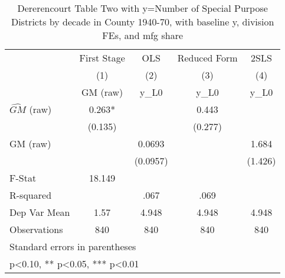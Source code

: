 \begin{table}[htbp]\centering
\def\sym#1{\ifmmode^{#1}\else\(^{#1}\)\fi}
\caption{Dererencourt Table Two with y=Number of Special Purpose Districts by decade in County 1940-70, with baseline y, division FEs, and mfg share}
\begin{tabular}{l*{4}{c}}
\toprule
                    & First Stage   &         OLS   &Reduced Form   &        2SLS   \\
                    &\multicolumn{1}{c}{(1)}&\multicolumn{1}{c}{(2)}&\multicolumn{1}{c}{(3)}&\multicolumn{1}{c}{(4)}\\
                    &\multicolumn{1}{c}{GM  (raw)}&\multicolumn{1}{c}{y\_L0}&\multicolumn{1}{c}{y\_L0}&\multicolumn{1}{c}{y\_L0}\\
\midrule
$\hat{GM}$ (raw)    &       0.263*  &               &       0.443   &               \\
                    &     (0.135)   &               &     (0.277)   &               \\
\addlinespace
GM  (raw)           &               &      0.0693   &               &       1.684   \\
                    &               &    (0.0957)   &               &     (1.426)   \\
\midrule
F-Stat              &      18.149   &               &               &               \\
R-squared           &               &        .067   &        .069   &               \\
Dep Var Mean        &        1.57   &       4.948   &       4.948   &       4.948   \\
Observations        &         840   &         840   &         840   &         840   \\
\bottomrule
\multicolumn{5}{l}{\footnotesize Standard errors in parentheses}\\
\multicolumn{5}{l}{\footnotesize * p<0.10, ** p<0.05, *** p<0.01}\\
\end{tabular}
\end{table}
